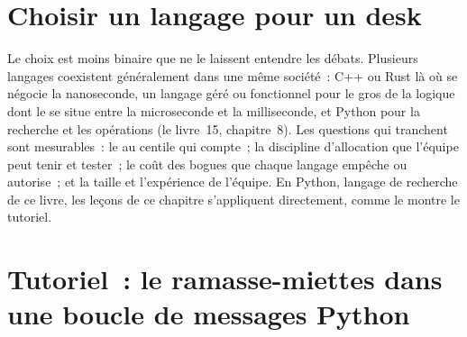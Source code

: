 \section{Choisir un langage pour un desk}

Le choix est moins binaire que ne le laissent entendre les débats. Plusieurs langages coexistent généralement dans une même société~: C++ ou Rust là où
se négocie la nanoseconde, un langage géré ou fonctionnel pour le gros de la logique dont
le  se situe entre la microseconde et la milliseconde, et Python pour la recherche et les opérations (le livre~15, chapitre~8). Les
questions qui tranchent sont mesurables~: le  au centile qui compte~; la discipline d'allocation que l'équipe
peut tenir et tester~; le coût des bogues que chaque langage empêche ou autorise~; et la taille et l'expérience de
l'équipe. En Python, langage de recherche de ce livre, les leçons de ce chapitre s'appliquent directement, comme le montre le tutoriel.

\section{Tutoriel~: le ramasse-miettes dans une boucle de messages Python}\label{tut:ll:managed-and-functional-languages-on-the-desk:tut}

